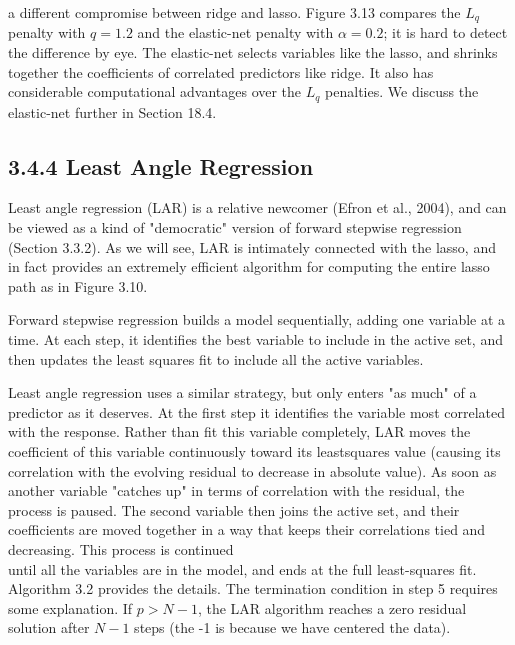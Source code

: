 \documentclass[10pt]{article}
\begin{document}
a different compromise between ridge and lasso. Figure 3.13 compares the $L_{q}$ penalty with $q=1.2$ and the elastic-net penalty with $\alpha=0.2$; it is hard to detect the difference by eye. The elastic-net selects variables like the lasso, and shrinks together the coefficients of correlated predictors like ridge. It also has considerable computational advantages over the $L_{q}$ penalties. We discuss the elastic-net further in Section 18.4.

\subsection*{3.4.4 Least Angle Regression}
Least angle regression (LAR) is a relative newcomer (Efron et al., 2004), and can be viewed as a kind of "democratic" version of forward stepwise regression (Section 3.3.2). As we will see, LAR is intimately connected with the lasso, and in fact provides an extremely efficient algorithm for computing the entire lasso path as in Figure 3.10.

Forward stepwise regression builds a model sequentially, adding one variable at a time. At each step, it identifies the best variable to include in the active set, and then updates the least squares fit to include all the active variables.

Least angle regression uses a similar strategy, but only enters "as much" of a predictor as it deserves. At the first step it identifies the variable most correlated with the response. Rather than fit this variable completely, LAR moves the coefficient of this variable continuously toward its leastsquares value (causing its correlation with the evolving residual to decrease in absolute value). As soon as another variable "catches up" in terms of correlation with the residual, the process is paused. The second variable then joins the active set, and their coefficients are moved together in a way that keeps their correlations tied and decreasing. This process is continued\\
until all the variables are in the model, and ends at the full least-squares fit. Algorithm 3.2 provides the details. The termination condition in step 5 requires some explanation. If $p>N-1$, the LAR algorithm reaches a zero residual solution after $N-1$ steps (the -1 is because we have centered the data).
\end{document}
